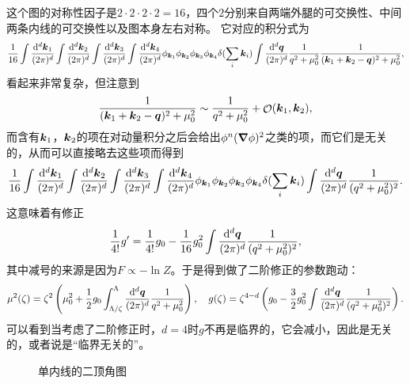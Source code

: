 \documentclass[hyperref, UTF8, a4paper]{ctexart}
\DeclareMathOperator{\bigO}{\mathcal{O}}
\begin{document}
这个图的对称性因子是$2 \cdot 2 \cdot 2 \cdot 2 = 16$，四个$2$分别来自两端外腿的可交换性、中间两条内线的可交换性以及图本身左右对称。
它对应的积分式为
\[
    \frac{1}{16} \int \frac{\dd[d]{\vb*{k}_1}}{(2\pi)^d} \int \frac{\dd[d]{\vb*{k}_2}}{(2\pi)^d} \int \frac{\dd[d]{\vb*{k}_3}}{(2\pi)^d} \int \frac{\dd[d]{\vb*{k}_4}}{(2\pi)^d} \phi_{\vb*{k}_1} \phi_{\vb*{k}_2} \phi_{\vb*{k}_3} \phi_{\vb*{k}_4} \delta(\sum_{i} \vb*{k}_i) \int \frac{\dd[d]{\vb*{q}}}{(2\pi)^d} \frac{1}{q^2 + \mu_0^2} \frac{1}{(\vb*{k}_1 + \vb*{k}_2 - \vb*{q})^2 + \mu_0^2},
\]
看起来非常复杂，但注意到
\[
    \frac{1}{(\vb*{k}_1 + \vb*{k}_2 - \vb*{q})^2 + \mu_0^2} \sim \frac{1}{q^2 + \mu_0^2} + \bigO(\vb*{k}_1, \vb*{k}_2),
\]
而含有$\vb*{k}_1$，$\vb*{k}_2$的项在对动量积分之后会给出$\phi^n (\grad{\phi})^2$之类的项，而它们是无关的，从而可以直接略去这些项而得到
\[
    \frac{1}{16} \int \frac{\dd[d]{\vb*{k}_1}}{(2\pi)^d} \int \frac{\dd[d]{\vb*{k}_2}}{(2\pi)^d} \int \frac{\dd[d]{\vb*{k}_3}}{(2\pi)^d} \int \frac{\dd[d]{\vb*{k}_4}}{(2\pi)^d} \phi_{\vb*{k}_1} \phi_{\vb*{k}_2} \phi_{\vb*{k}_3} \phi_{\vb*{k}_4} \delta(\sum_{i} \vb*{k}_i) \int \frac{\dd[d]{\vb*{q}}}{(2\pi)^d} \frac{1}{(q^2 + \mu_0^2)^2}.
\]
这意味着有修正
\[
    \frac{1}{4!} g' = \frac{1}{4!} g_0 - \frac{1}{16} g_0^2 \int \frac{\dd[d]{\vb*{q}}}{(2\pi)^d} \frac{1}{(q^2 + \mu_0^2)^2},
\]
其中减号的来源是因为$F \propto - \ln Z$。于是得到做了二阶修正的参数跑动：
\begin{equation}
    \mu^2(\zeta) = \zeta^2 \left( \mu_0^2 + \frac{1}{2} g_0 \int^\Lambda_{\Lambda/\zeta} \frac{\dd[d]{\vb*{q}}}{(2\pi)^d} \frac{1}{q^2 + \mu_0^2} \right), \quad g(\zeta) = \zeta^{4-d} \left( g_0 - \frac{3}{2} g_0^2 \int \frac{\dd[d]{\vb*{q}}}{(2\pi)^d} \frac{1}{(q^2 + \mu_0^2)^2} \right).
\end{equation}
可以看到当考虑了二阶修正时，$d=4$时$g$不再是临界的，它会减小，因此是无关的，或者说是“临界无关的”。

\begin{figure}
    \centering
    \caption{单内线的二顶角图}
    \label{fig:single-second-order-correction}
\end{figure}
\end{document}
